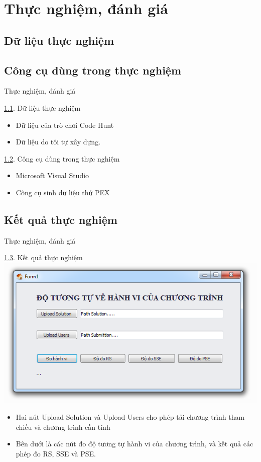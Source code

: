 \section{Thực nghiệm, đánh giá}
\label{sec:TNDG}
\subsection{Dữ liệu thực nghiệm}
\label{subsec:DLTN}

\subsection{Công cụ dùng trong thực nghiệm}
\label{subsec:tools}
\begin{frame}{Thực nghiệm, đánh giá}
\begin{block}{\ref{subsec:DLTN}. Dữ liệu thực nghiệm}
	\begin{itemize}
		\item Dữ liệu của trò chơi Code Hunt
		\item Dữ liệu do tôi tự xây dựng.
	\end{itemize}
\end{block}
\begin{block}{\ref{subsec:tools}. Công cụ dùng trong thực nghiệm}
\begin{itemize}
\item Microsoft Visual Studio
\item Công cụ sinh dữ liệu thử PEX
\end{itemize}
\end{block}
\end{frame}

\subsection{Kết quả thực nghiệm}
\label{subsec:DGKQTN}
\begin{frame}{Thực nghiệm, đánh giá}
\begin{block}{\ref{subsec:DGKQTN}. Kết quả thực nghiệm}
\centering
\includegraphics[width=0.8\linewidth]{images/main.png}
\begin{itemize}
	\item Hai nút Upload Solution và Upload Users cho phép tải 
	chương trình tham chiếu và chương trình cần tính
	\item Bên dưới là các nút đo độ tương tự hành vi của chương
	trình, và kết quả các phép đo RS, SSE và PSE.
\end{itemize}	
\end{block}
\end{frame}

